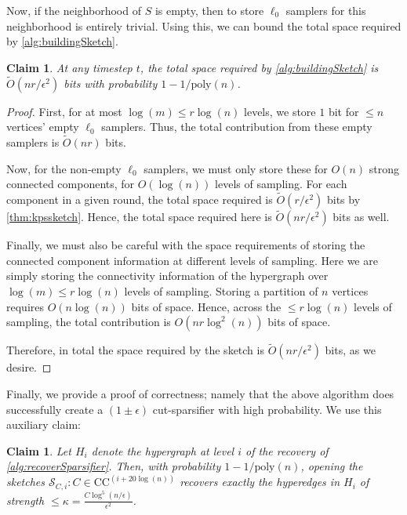 \documentclass[11pt]{article}
\newtheorem{claim}[theorem]{Claim}
\theoremstyle{definition}
\newcommand{\eps}{\epsilon}
\begin{document}
Now, if the neighborhood of $S$ is empty, then to store $\ell_0$ samplers for this neighborhood is entirely trivial. Using this, we can bound the total space required by \cref{alg:buildingSketch}.

\begin{claim}\label{clm:sketchSpaceInsertion}
	At any timestep $t$, the total space required by \cref{alg:buildingSketch} is $\widetilde{O}(nr / \eps^2)$ bits with probability $1 - 1 / \mathrm{poly}(n)$.
\end{claim}

\begin{proof}
	First, for at most $\log(m) \leq r \log(n)$ levels, we store $1$ bit for $\leq n$ vertices' empty $\ell_0$ samplers. Thus, the total contribution from these empty samplers is $\widetilde{O}(nr)$ bits. 
	
	Now, for the non-empty $\ell_0$ samplers, we must only store these for $O(n)$ strong connected components, for $O(\log(n))$ levels of sampling. For each component in a given round, the total space required is $\widetilde{O}(r  / \eps^2)$ bits by \cref{thm:kpssketch}. Hence, the total space required here is $\widetilde{O}(nr / \eps^2)$ bits as well. 
	
	Finally, we must also be careful with the space requirements of storing the connected component information at different levels of sampling. Here we are simply storing the connectivity information of the hypergraph over $\log(m) \leq r \log(n)$ levels of sampling. Storing a partition of $n$ vertices requires $O(n \log(n))$ bits of space. Hence, across the $\leq r \log(n)$ levels of sampling, the total contribution is $O(nr \log^2(n))$ bits of space.
	
	Therefore, in total the space required by the sketch is $\widetilde{O}(nr / \eps^2)$ bits, as we desire. 
\end{proof}

Finally, we provide a proof of correctness; namely that the above algorithm does successfully create a $(1 \pm \eps)$ cut-sparsifier with high probability. We use this auxiliary claim:

\begin{claim}\label{clm:recoversLowStrength}
	Let $H_i$ denote the hypergraph at level $i$ of the recovery of \cref{alg:recoverSparsifier}. Then, with probability $1 - 1 / \mathrm{poly}(n)$, opening the sketches $\mathcal{S}_{C, i}: C \in \mathrm{CC}^{(i + 20 \log(n))}$ recovers exactly the hyperedges in $H_i$ of strength $\leq \kappa =  \frac{C \log^5(n / \eps)}{ \eps^2}$.
	\end{claim}
\end{document}
